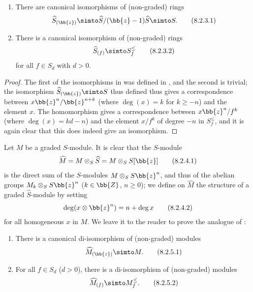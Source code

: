 \begin{lemma}[8.2.3]
\label{II.8.2.3}
\begin{enumerate}
  \item[\rm{(i)}] There are canonical isomorphisms of (non-graded) rings
    \[
    \label{II.8.2.3.1}
      \widehat{S}_{(\bb{z})}
      \simto
      \widehat{S}/(\bb{z}-1)\widehat{S}
      \simto
      S.
    \tag{8.2.3.1}
    \]
  \item[\rm{(ii)}] There is a canonical isomorphism of (non-graded) rings
    \[
    \label{II.8.2.3.2}
      \widehat{S}_{(f)} \simto S_f^\leq
    \tag{8.2.3.2}
    \]
    for all $f\in S_d$ with $d>0$.
\end{enumerate}
\end{lemma}

\begin{proof}
The first of the isomorphisms in  was defined in , and the second is trivial;
the isomorphism $\widehat{S}_{(\bb{z})} \simto S$ thus defined thus gives a correspondence between $x\bb{z}^n/\bb{z}^{n+k}$ (where $\deg(x) = k$ for $k\geq -n$) and the element $x$.
The homomorphism  gives a correspondence between $x\bb{z}^n/f^k$ (where $\deg(x) = kd-n$) and the element $x/f^k$ of degree $-n$ in $S_f^\leq$, and it is again clear that this does indeed give an isomorphism.
\end{proof}

\begin{env}[8.2.4]
\label{II.8.2.4}
Let $M$ be a graded $S$-module.
It is clear that the $S$-module
\[
\label{II.8.2.4.1}
  \widehat{M} = M \otimes_S \widehat{S} = M \otimes_S S[\bb{z}]
\tag{8.2.4.1}
\]
is the direct sum of the $S$-modules $M\otimes_S S\bb{z}^n$, and thus of the abelian groups $M_k\otimes_S S\bb{z}^n$ ($k\in\bb{Z}$, $n\geq0$);
we define on $\widehat{M}$ the structure of a graded $\widehat{S}$-module by setting
\[
\label{II.8.2.4.2}
  \deg(x\otimes\bb{z}^n) = n+\deg x
\tag{8.2.4.2}
\]
for all homogeneous $x$ in $M$.
We leave it to the reader to prove the analogue of :
\end{env}

\begin{lemma}[8.2.5]
\label{II.8.2.5}
\begin{enumerate}
  \item[\rm{(i)}] There is a canonical di-isomorphism of (non-graded) modules
    \[
    \label{II.8.2.5.1}
      \widehat{M}_{(\bb{z})} \simto M.
    \tag{8.2.5.1}
    \]
  \item[\rm{(ii)}] For all $f\in S_d$ ($d>0$), there is a di-isomorphism of (non-graded) modules
    \[
    \label{II.8.2.5.2}
      \widehat{M}_{(f)} \simto M_f^\leq.
    \tag{8.2.5.2}
    \]
\end{enumerate}
\end{lemma}

